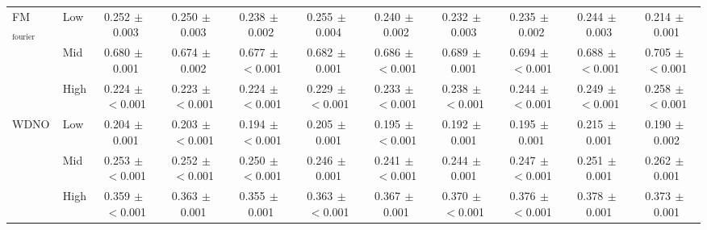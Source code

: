 \begin{table}[ht]
{\begin{tabular}{llccccccccc}
\midrule
\multirow{3}{*}{FM$_\text{fourier}$} & Low & 0.252{\scriptsize$\,\pm\,$0.003} & 0.250{\scriptsize$\,\pm\,$0.003} & 0.238{\scriptsize$\,\pm\,$0.002} & 0.255{\scriptsize$\,\pm\,$0.004} & 0.240{\scriptsize$\,\pm\,$0.002} & 0.232{\scriptsize$\,\pm\,$0.003} & 0.235{\scriptsize$\,\pm\,$0.002} & 0.244{\scriptsize$\,\pm\,$0.003} & 0.214{\scriptsize$\,\pm\,$0.001} \\
 & Mid & 0.680{\scriptsize$\,\pm\,$0.001} & 0.674{\scriptsize$\,\pm\,$0.002} & 0.677{\scriptsize$\,\pm\,$$<$0.001} & 0.682{\scriptsize$\,\pm\,$0.001} & 0.686{\scriptsize$\,\pm\,$$<$0.001} & 0.689{\scriptsize$\,\pm\,$0.001} & 0.694{\scriptsize$\,\pm\,$$<$0.001} & 0.688{\scriptsize$\,\pm\,$$<$0.001} & 0.705{\scriptsize$\,\pm\,$$<$0.001} \\
 & High & 0.224{\scriptsize$\,\pm\,$$<$0.001} & 0.223{\scriptsize$\,\pm\,$$<$0.001} & 0.224{\scriptsize$\,\pm\,$$<$0.001} & 0.229{\scriptsize$\,\pm\,$$<$0.001} & 0.233{\scriptsize$\,\pm\,$$<$0.001} & 0.238{\scriptsize$\,\pm\,$$<$0.001} & 0.244{\scriptsize$\,\pm\,$$<$0.001} & 0.249{\scriptsize$\,\pm\,$$<$0.001} & 0.258{\scriptsize$\,\pm\,$$<$0.001} \\
\midrule
\multirow{3}{*}{WDNO} & Low & 0.204{\scriptsize$\,\pm\,$0.001} & 0.203{\scriptsize$\,\pm\,$$<$0.001} & 0.194{\scriptsize$\,\pm\,$$<$0.001} & 0.205{\scriptsize$\,\pm\,$0.001} & 0.195{\scriptsize$\,\pm\,$$<$0.001} & 0.192{\scriptsize$\,\pm\,$0.001} & 0.195{\scriptsize$\,\pm\,$0.001} & 0.215{\scriptsize$\,\pm\,$0.001} & 0.190{\scriptsize$\,\pm\,$0.002} \\
 & Mid & 0.253{\scriptsize$\,\pm\,$$<$0.001} & 0.252{\scriptsize$\,\pm\,$$<$0.001} & 0.250{\scriptsize$\,\pm\,$$<$0.001} & 0.246{\scriptsize$\,\pm\,$0.001} & 0.241{\scriptsize$\,\pm\,$$<$0.001} & 0.244{\scriptsize$\,\pm\,$0.001} & 0.247{\scriptsize$\,\pm\,$$<$0.001} & 0.251{\scriptsize$\,\pm\,$0.001} & 0.262{\scriptsize$\,\pm\,$0.001} \\
 & High & 0.359{\scriptsize$\,\pm\,$$<$0.001} & 0.363{\scriptsize$\,\pm\,$0.001} & 0.355{\scriptsize$\,\pm\,$0.001} & 0.363{\scriptsize$\,\pm\,$$<$0.001} & 0.367{\scriptsize$\,\pm\,$0.001} & 0.370{\scriptsize$\,\pm\,$$<$0.001} & 0.376{\scriptsize$\,\pm\,$$<$0.001} & 0.378{\scriptsize$\,\pm\,$0.001} & 0.373{\scriptsize$\,\pm\,$0.001} \\
\bottomrule
\end{tabular}
}
\end{table}
